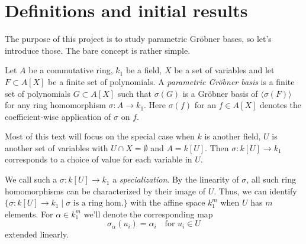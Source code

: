 \documentclass[a4paper, 12pt]{article}
\theoremstyle{changedot}
\theoremstyle{changedotbreak}
\theoremstyle{nonumberplain}
\begin{document}
\section{Definitions and initial results}
The purpose of this project is to study parametric Gröbner bases, so let's introduce those. The bare concept is rather simple.

\begin{definition}\label{def:par_grb}
  Let $A$ be a commutative ring, $k_{1}$ be a field, $X$ be a set of variables and let $F \subset A[X]$ be a finite set of polynomials. A \textit{parametric Gröbner basis} is a finite set of polynomials $G \subset A[X]$ such that $\sigma(G)$ is a Gröbner basis of $\langle \sigma(F) \rangle$ for any ring homomorphism $\sigma : A \to k_{1}$. Here $\sigma(f)$ for an $f \in A[X]$ denotes the coefficient-wise application of $\sigma$ on $f$.

  Most of this text will focus on the special case when $k$ is another field, $U$ is another set of variables with $U \cap X = \emptyset$ and $A = k[U]$. Then $\sigma : k[U] \to k_{1}$ corresponds to a choice of value for each variable in $U$.
\end{definition}

We call such a $\sigma : k[U] \to k_{1}$ a \textit{specialization}. By the linearity of $\sigma$, all such ring homomorphisms can be characterized by their image of $U$. Thus, we can identify $\{\sigma : k[U] \to k_{1} \mid \sigma \text{ is a ring hom.}\}$ with the affine space $k_{1}^{m}$ when $U$ has $m$ elements. For $\alpha \in k_{1}^{m}$ we'll denote the corresponding map
\[\sigma_{\alpha}(u_{i}) = \alpha_{i} \quad \text{for $u_{i} \in U$}\] extended linearly.
\end{document}
